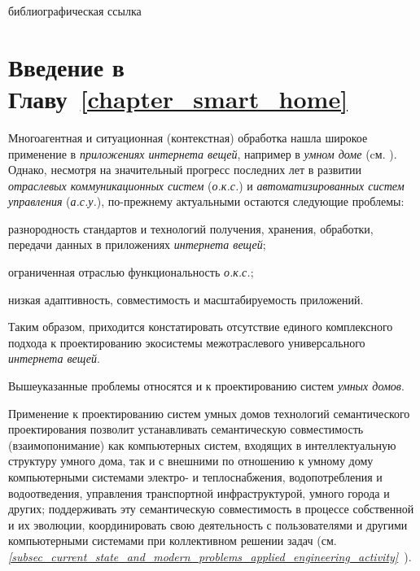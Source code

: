 \begin{SCn}
	\bigskip
	
	\begin{scnrelfromlist}{библиографическая ссылка}
	\end{scnrelfromlist}	
\end{SCn}

\section*{Введение в Главу~\ref{chapter_smart_home}}

Многоагентная и ситуационная (контекстная) обработка нашла широкое применение в \textit{приложениях интернета вещей}, например в \textit{умном доме} (cм. ). Однако, несмотря на значительный прогресс последних лет в развитии \textit{отраслевых коммуникационных систем} (\textit{о.к.с.}) и \textit{автоматизированных систем управления} (\textit{а.с.у.}), по-прежнему актуальными остаются следующие проблемы:
\begin{textitemize}
	\item разнородность стандартов и технологий получения, хранения, обработки, передачи данных в приложениях \textit{интернета вещей};
	\item ограниченная отраслью функциональность \textit{о.к.с.};
	\item низкая адаптивность, совместимость и масштабируемость приложений.
\end{textitemize}

Таким образом, приходится констатировать отсутствие единого комплексного подхода к проектированию экосистемы межотраслевого универсального \textit{интернета вещей}.

Вышеуказанные проблемы относятся и к проектированию систем \textit{умных домов}.

Применение к проектированию систем умных домов технологий семантического проектирования позволит устанавливать семантическую совместимость (взаимопонимание)  как компьютерных систем, входящих в интеллектуальную структуру умного дома, так и с внешними по отношению к умному дому компьютерными системами электро- и теплоснабжения, водопотребления и водоотведения, управления транспортной инфраструктурой, умного города и других; поддерживать эту семантическую совместимость в процессе собственной и их эволюции, координировать свою деятельность с пользователями и другими компьютерными системами при коллективном решении задач (см. \textit{\ref{subsec_current_state_and_modern_problems_applied_engineering_activity}~}).

